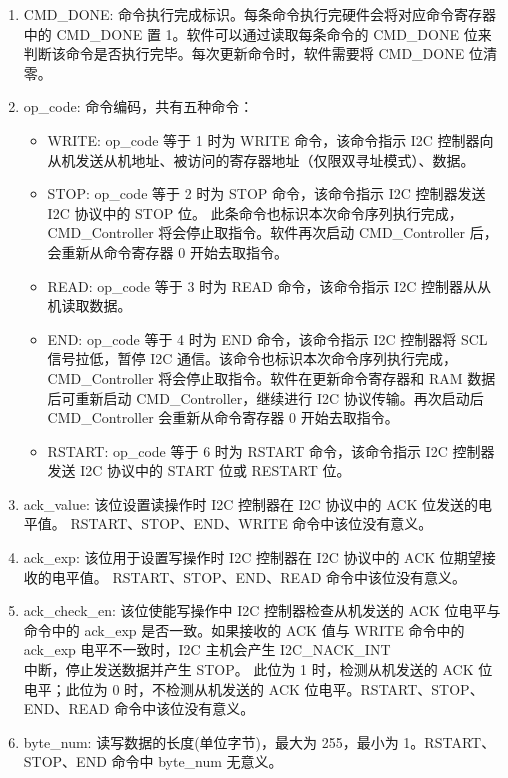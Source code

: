 \documentclass[main\_\_CN.tex]{subfiles}
\begin{document}
\begin{enumerate}

\item CMD\_DONE: 命令执行完成标识。每条命令执行完硬件会将对应命令寄存器中的 CMD\_DONE 置 1。软件可以通过读取每条命令的 CMD\_DONE 位来判断该命令是否执行完毕。每次更新命令时，软件需要将 CMD\_DONE 位清零。

\item op\_code: 命令编码，共有五种命令：

\begin{itemize}

    \item WRITE: op\_code 等于 1 时为 WRITE 命令，该命令指示 I2C 控制器向从机发送从机地址、被访问的寄存器地址（仅限双寻址模式）、数据。
    
    \item STOP: op\_code 等于 2 时为 STOP 命令，该命令指示 I2C 控制器发送 I2C 协议中的 STOP 位。 此条命令也标识本次命令序列执行完成，CMD\_Controller 将会停止取指令。软件再次启动 CMD\_Controller 后，会重新从命令寄存器 0 开始去取指令。
    
    \item READ: op\_code 等于 3 时为 READ 命令，该命令指示 I2C 控制器从从机读取数据。
    
    \item END: op\_code 等于 4 时为 END 命令，该命令指示 I2C 控制器将 SCL 信号拉低，暂停 I2C 通信。该命令也标识本次命令序列执行完成，CMD\_Controller 将会停止取指令。软件在更新命令寄存器和 RAM 数据后可重新启动 CMD\_Controller，继续进行 I2C 协议传输。再次启动后 CMD\_Controller 会重新从命令寄存器 0 开始去取指令。 

    \item RSTART: op\_code 等于 6 时为 RSTART 命令，该命令指示 I2C 控制器发送 I2C 协议中的 START 位或 RESTART 位。
    
\end{itemize}

\item ack\_value: 该位设置读操作时 I2C 控制器在 I2C 协议中的 ACK 位发送的电平值。 RSTART、STOP、END、WRITE 命令中该位没有意义。

\item ack\_exp: 该位用于设置写操作时 I2C 控制器在 I2C 协议中的 ACK 位期望接收的电平值。 RSTART、STOP、END、READ 命令中该位没有意义。

\item ack\_check\_en: 该位使能写操作中 I2C 控制器检查从机发送的 ACK 位电平与命令中的 ack\_exp 是否一致。如果接收的 ACK 值与 WRITE 命令中的 ack\_exp 电平不一致时，I2C 主机会产生 I2C\_NACK\_INT\\ 中断，停止发送数据并产生 STOP。 此位为 1 时，检测从机发送的 ACK 位电平；此位为 0 时，不检测从机发送的 ACK 位电平。RSTART、STOP、END、READ 命令中该位没有意义。

\item byte\_num: 读写数据的长度(单位字节)，最大为 255，最小为 1。RSTART、STOP、END 命令中 byte\_num 无意义。

\end{enumerate}
\end{document}

